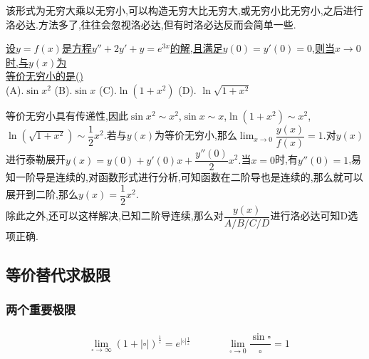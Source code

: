 \documentclass[8pt a4paper, oneside, UTF8]{ctexbook}
\begin{document}
\begin{sloppypar}
\begin{solution}
    \end{solution}
    \begin{note}
        该形式为无穷大乘以无穷小,可以构造无穷大比无穷大,或无穷小比无穷小,之后进行洛必达.方法多了,往往会忽视洛必达,但有时洛必达反而会简单一些.
    \end{note}
    \begin{problem}
        \uline{设$y=f(x)$是方程$y''+2y'+y=e^{3x}$的解,且满足$y(0)=y'(0)=0$,则当$x\to 0$时,与$y(x)$为\\等价无穷小的是()}\\
        (A).$\sin x^2$ \qquad (B).$\sin x$ \qquad (C).$\ln(1+x^2)$ \qquad (D). $\ln \sqrt{1+x^2}$
    \end{problem}
    \begin{solution}
        等价无穷小具有传递性,因此$\sin x^2 \sim x^2$,$\sin x \sim x$,$\ln (1+x^2) \sim x^2$,$\ln (\sqrt{1+x^2})\sim \dfrac{1}{2}x^2$.若与$y(x)$为等价无穷小,那么$\lim_{x\to 0}\dfrac{y(x)}{f(x)}=1$.对$y(x)$进行泰勒展开$y(x)=y(0)+y'(0)x+\dfrac{y''(0)}{2}x^2.$当$x=0$时,有$y''(0)=1$,易知一阶导是连续的,对函数形式进行分析,可知函数在二阶导也是连续的,那么就可以展开到二阶,那么$y(x)=\dfrac{1}{2}x^2$.\\
        除此之外,还可以这样解决,已知二阶导连续,那么对$\dfrac{y(x)}{A/B/C/D}$进行洛必达可知D选项正确.
    \end{solution}
    \subsection{等价替代求极限}
    \subsubsection{两个重要极限}
    \begin{align*} \boxed
        {
            \begin{aligned}
                 & \lim_{\square \to \infty }(1+|\square|)^{\frac{1}{\square}}=e^{|\square| \frac{1}{\square}} \qquad    & &  \lim _ { \square \rightarrow 0 } \dfrac { \sin \square } { \square } = 1 \\
            \end{aligned}
        }
    \end{align*}

\end{sloppypar}
\end{document}
